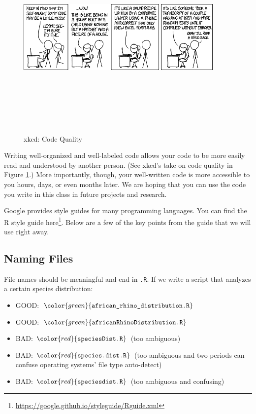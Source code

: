 \documentclass[]{krantz}
\providecommand{\tightlist}{%
  \setlength{\itemsep}{0pt}\setlength{\parskip}{0pt}}
\renewcommand{\href}[2]{#2\footnote{\url{#1}}}
\begin{document}
\begin{figure}
\includegraphics[width=4in,height=4in]{../figures/code_quality} \caption{xkcd: Code Quality}\label{fig:comic}
\end{figure}

Writing well-organized and well-labeled code allows your code to be more
easily read and understood by another person. (See xkcd's take on code
quality in Figure \ref{fig:comic}.) More importantly, though, your
well-written code is more accessible to you hours, days, or even months
later. We are hoping that you can use the code you write in this class
in future projects and research.

Google provides style guides for many programming languages. You can
find the R style guide
\href{https://google.github.io/styleguide/Rguide.xml}{here}. Below are a
few of the key points from the guide that we will use right away.

\subsection{Naming Files}\label{naming-files}

File names should be meaningful and end in \texttt{.R}. If we write a
script that analyzes a certain species distribution:

\begin{itemize}
\tightlist
\item
  GOOD: \(\color{green}{\verb+african_rhino_distribution.R+}\)
\item
  GOOD: \(\color{green}{\verb+africanRhinoDistribution.R+}\)
\item
  BAD: \(\color{red}{\verb+speciesDist.R+}\) (too ambiguous)
\item
  BAD: \(\color{red}{\verb+species.dist.R+}\) (too ambiguous and two
  periods can confuse operating systems' file type auto-detect)
\item
  BAD: \(\color{red}{\verb+speciesdist.R+}\) (too ambiguous and
  confusing)
\end{itemize}
\end{document}

